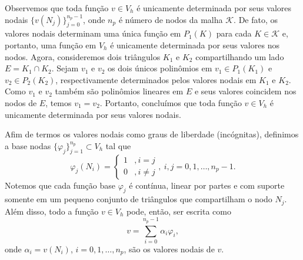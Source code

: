 Observemos que toda função $v\in V_h$ é unicamente determinada por seus valores nodais $\{v(N_j)\}_{j=0}^{n_p-1}$, onde $n_p$ é número de nodos da malha $\mathcal{K}$. De fato, os valores nodais determinam uma única função em $P_1(K)$ para cada $K\in\mathcal{K}$ e, portanto, uma função em $V_h$ é unicamente determinada por seus valores nos nodos. Agora, consideremos dois triângulos $K_1$ e $K_2$ compartilhando um lado $E = K_1\cap K_2$. Sejam $v_1$ e $v_2$ os dois únicos polinômios em $v_1\in P_1(K_1)$ e $v_2\in P_2(K_2)$, respectivamente determinados pelos valores nodais em $K_1$ e $K_2$. Como $v_1$ e $v_2$ também são polinômios lineares em $E$ e seus valores coincidem nos nodos de $E$, temos $v_1 = v_2$. Portanto, concluímos que toda função $v\in V_h$ é unicamente determinada por seus valores nodais.

Afim de termos os valores nodais como graus de liberdade (incógnitas), definimos a base nodas $\{\varphi_j\}_{j=1}^{n_p}\subset V_h$ tal que
\begin{equation}
  \varphi_j(N_i) = \left\{
    \begin{array}{ll}
      1 &, i=j\\
      0 &, i\neq j
    \end{array}
\right.,~i,j=0, 1, \dotsc, n_p-1.
\end{equation}
Notemos que cada função base $\varphi_j$ é contínua, linear por partes e com suporte somente em um pequeno conjunto de triângulos que compartilham o nodo $N_j$. Além disso, todo a função $v\in V_h$ pode, então, ser escrita como
\begin{equation}
  v = \sum_{i=0}^{n_p-1}\alpha_i\varphi_i,
\end{equation}
onde $\alpha_i = v(N_i)$, $i=0, 1, \ldots, n_p$, são os valores nodais de $v$.

